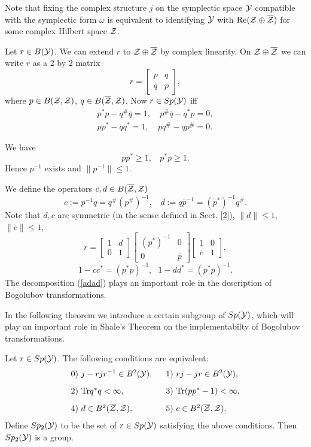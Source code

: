 \documentclass{svmult}
\newcommand{\beq}{\begin{equation}}
\newcommand{\eeq}{\end{equation}}
\def\bet{\begin{theorem}}
\def\eet{\end{theorem}}
\def\Re{{\rm Re}}
\def\bar{\overline}
\def\cZ{{\cal Z}}
\def\cY{{\cal Y}}
\def\Tr{{\rm Tr}}
\def\one{{\bf 1}}
\def\ii{ j }
\def\Tr{{\rm Tr}}
\def\one{{ 1}}
\def\t{{\scriptscriptstyle\#}}
\begin{document}
Note that fixing the complex structure $j$ on the symplectic space
$\cY$ compatible with the symplectic form $\omega$
is equivalent to identifying $\cY$ with $\Re(\cZ\oplus\bar\cZ)$
for some complex Hilbert space $\cZ$.










 Let $r\in
B(\cY)$. We can extend $r$ to $\cZ\oplus\bar\cZ$ by complex linearity.
On $\cZ\oplus\bar\cZ$
we can write $r$ as a 2 by 2 matrix
\[r=\left[\begin{array}{cc}p&q\\ \bar q&\bar p\end{array}\right],\]
where $p\in B(\cZ,\cZ)$, $q\in B(\bar\cZ,\cZ)$.
Now $r\in Sp(\cY)$ iff
\[\begin{array}{ll}
p^*p- q^\t\bar q=1,&\ 
 p^\t\bar q-q^*p=0,\\[3mm]
pp^*-qq^*=1,&
p q^\t-q p^\t=0.
\end{array}\]

We have
\[pp^*\geq1,\ \ \ \ p^*p\geq1.\]
Hence $p^{-1}$ exists and $\|p^{-1}\|\leq1$.

We define the operators  $c,d\in B(\bar\cZ,\cZ)$
\[c:=p^{-1} q=q^\t(p^\t)^{-1},\ \ \ \ d:=q\bar p^{-1}=(p^*)^{-1}q^\t.\]
Note that $d,c$ are symmetric (in the sense defined in Sect. \ref{2}), $\|d\|\leq1$, $\|c\|\leq1$,
\beq r=\left[\begin{array}{cc}1&d\\0&1\end{array}\right]
\left[\begin{array}{cc}(p^*)^{-1}&0\\0&\bar p\end{array}\right]
\left[\begin{array}{cc}1&0\\\bar c&1\end{array}\right],\label{adad}\eeq
\[1-cc^*=(p^*p)^{-1},\ \ \ 1-dd^*=(\bar p^*\bar p)^{-1}.\]
The decomposition (\ref{adad}) plays an important role in the 
description of Bogolubov
transformations. 


In the following theorem we introduce a certain subgroup of $Sp(\cY)$,
which will play an important role in Shale's Theorem on the implementabilty
of Bogolubov transformations.
\bet Let $r\in Sp(\cY)$. The following conditions are equivalent:
\[\begin{array}{ll} 0)\ \ii-r\ii r^{-1}\in B^2(\cY),\ \ &
1)\  r\ii-\ii r\in B^2(\cY),\\[3mm] 2)\  \Tr q^*q<\infty,& 3)\ 
\Tr(pp^*-\one)<\infty,\\[3mm]
4) \ d\in B^2(\bar\cZ,\cZ),& 5) \ c\in B^2(\bar\cZ,\cZ).
\end{array}\]
Define $Sp_2(\cY)$ 
to be the set of  $r\in Sp(\cY)$ satisfying the
above conditions. Then $Sp_2(\cY)$ is a group.
\label{rdr}\eet
\end{document}
